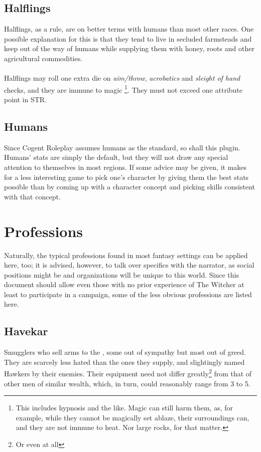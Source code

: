 \documentclass[parskip=full,11pt,%
footheight=38pt]{scrreport}
\begin{document}
\subsection{Halflings}
Halflings, as a rule, are on better terms with humans than most other races. One possible explanation for this is that they tend to live
in secluded farmsteads and keep out of the way of humans while supplying them with honey, roots and other agricultural commodities.
\\\\
Halflings may roll one extra die on \textit{aim/throw}, \textit{acrobatics} and \textit{sleight of hand} checks, and they are immune to magic%
\footnote{This includes hypnosis and the like. Magic can still harm them, as, for example, while they cannot be magically set ablaze, their surroundings
	can, and they are not immune to heat. Nor large rocks, for that matter.}. They must not exceed one attribute point in STR.

\subsection{Humans}
Since Cogent Roleplay assumes humans as the standard, so shall this plugin. Humans' stats are simply the default,
but they will not draw any special attention to themselves in most regions. If some advice may be given, it makes
for a less interesting game to pick one's character by giving them the best stats possible than by coming up with
a character concept and picking skills consistent with that concept.

\section{Professions}
Naturally, the typical professions found in most fantasy settings can be applied here, too; it is advised, however, to talk over specifics with
the narrator, as social positions might be and organizations will be unique to this world. Since this document should allow even those with no
prior experience of The Witcher at least to participate in a campaign, some of the less obvious professions are listed here.

\subsection{Havekar}
Smugglers who sell arms to the , some out of sympathy but most out of greed. They are scarcely less hated than the ones they supply,
and slightingly named Hawkers by their enemies. Their equipment need not differ greatly\footnote{Or even at all} from that of other men of similar
wealth, which, in turn, could reasonably range from 3 to 5.
\end{document}
